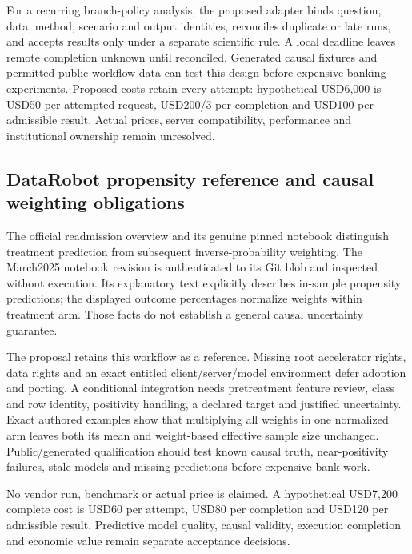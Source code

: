 For a recurring branch-policy analysis, the proposed adapter binds
question, data, method, scenario and output identities, reconciles
duplicate or late runs, and accepts results only under a separate
scientific rule. A local deadline leaves remote completion unknown until
reconciled. Generated causal fixtures and permitted public workflow data
can test this design before expensive banking experiments. Proposed
costs retain every attempt: hypothetical USD6,000 is USD50 per attempted
request, USD200/3 per completion and USD100 per admissible result.
Actual prices, server compatibility, performance and institutional
ownership remain unresolved.\citep{exec25_dataiku_choice}

\hypertarget{datarobot-propensity-reference-and-causal-weighting-obligations}{%
\subsection{DataRobot propensity reference and causal weighting
obligations}\label{datarobot-propensity-reference-and-causal-weighting-obligations}}

The official readmission overview and its genuine pinned notebook
distinguish treatment prediction from subsequent inverse-probability
weighting. The March2025 notebook revision is authenticated to its Git
blob and inspected without execution. Its explanatory text explicitly
describes in-sample propensity predictions; the displayed outcome
percentages normalize weights within treatment arm. Those facts do not
establish a general causal uncertainty
guarantee.\citep{exec13_ch_datarobot,exec25_datarobot_notebook,exec25_datarobot_choice}

The proposal retains this workflow as a reference. Missing root
accelerator rights, data rights and an exact entitled
client/server/model environment defer adoption and porting. A
conditional integration needs pretreatment feature review, class and row
identity, positivity handling, a declared target and justified
uncertainty. Exact authored examples show that multiplying all weights
in one normalized arm leaves both its mean and weight-based effective
sample size unchanged. Public/generated qualification should test known
causal truth, near-positivity failures, stale models and missing
predictions before expensive bank
work.\citep{exec25_datarobot_notebook,exec25_datarobot_choice}

No vendor run, benchmark or actual price is claimed. A hypothetical
USD7,200 complete cost is USD60 per attempt, USD80 per completion and
USD120 per admissible result. Predictive model quality, causal validity,
execution completion and economic value remain separate acceptance
decisions.\citep{exec25_datarobot_choice}

